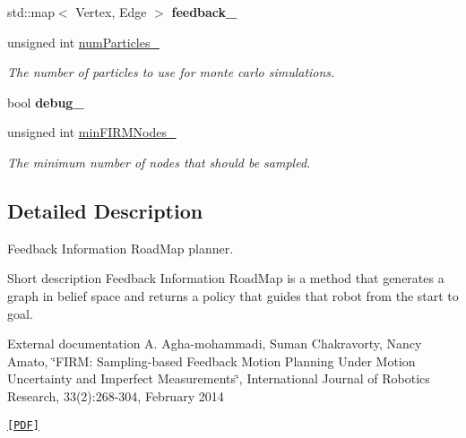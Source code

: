 \begin{DoxyCompactItemize}
\item 
\hypertarget{class_f_i_r_m_aae9e2e83177ef121adc36ef7f9e5d16d}{std\-::map$<$ \-Vertex, \-Edge $>$ {\bfseries feedback\-\_\-}}\label{class_f_i_r_m_aae9e2e83177ef121adc36ef7f9e5d16d}

\item 
\hypertarget{class_f_i_r_m_a17cff52eb2c31715ab8341b9daea1a3f}{unsigned int \hyperlink{class_f_i_r_m_a17cff52eb2c31715ab8341b9daea1a3f}{num\-Particles\-\_\-}}\label{class_f_i_r_m_a17cff52eb2c31715ab8341b9daea1a3f}

\begin{DoxyCompactList}\small\item\em \-The number of particles to use for monte carlo simulations. \end{DoxyCompactList}\item 
\hypertarget{class_f_i_r_m_a7fc88496b950b90b92876dea03b3102f}{bool {\bfseries debug\-\_\-}}\label{class_f_i_r_m_a7fc88496b950b90b92876dea03b3102f}

\item 
\hypertarget{class_f_i_r_m_add9de6c5accdea0f9b6d1ff458350036}{unsigned int \hyperlink{class_f_i_r_m_add9de6c5accdea0f9b6d1ff458350036}{min\-F\-I\-R\-M\-Nodes\-\_\-}}\label{class_f_i_r_m_add9de6c5accdea0f9b6d1ff458350036}

\begin{DoxyCompactList}\small\item\em \-The minimum number of nodes that should be sampled. \end{DoxyCompactList}\end{DoxyCompactItemize}


\subsection{\-Detailed \-Description}
\-Feedback \-Information \-Road\-Map planner. 

\label{class_f_i_r_m_FIRM}%
\hypertarget{class_f_i_r_m_FIRM}{}%
 \begin{DoxyParagraph}{\-Short description}
\-Feedback \-Information \-Road\-Map is a method that generates a graph in belief space and returns a policy that guides that robot from the start to goal.
\end{DoxyParagraph}
\begin{DoxyParagraph}{\-External documentation}
\-A. \-Agha-\/mohammadi, \-Suman \-Chakravorty, \-Nancy \-Amato, \char`\"{}\-F\-I\-R\-M\-: Sampling-\/based Feedback Motion Planning Under Motion 
   Uncertainty and Imperfect Measurements\char`\"{}, \-International \-Journal of \-Robotics \-Research, 33(2)\-:268-\/304, \-February 2014
\end{DoxyParagraph}
\href{http://www.mit.edu/~aliagha/Web/pubpdfs/2014.Ali.Suman.ea.IJRR_FIRM.pdf}{\tt \mbox{[}\-P\-D\-F\mbox{]}} 

